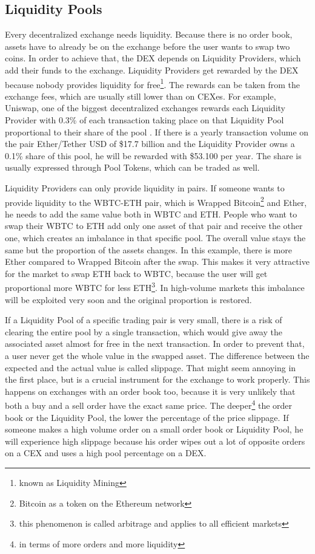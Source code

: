 \subsection{Liquidity Pools}
Every decentralized exchange needs liquidity. Because there is no order book, assets have to already be on the exchange before the user wants to swap two coins. In order to achieve that, the DEX depends on Liquidity Providers, which add their funds to the exchange. Liquidity Providers get rewarded by the DEX because nobody provides liquidity for free\footnote{known as Liquidity Mining}. The rewards can be taken from the exchange fees, which are usually still lower than on CEXes. For example, Uniswap, one of the biggest decentralized exchanges rewards each Liquidity Provider with 0.3\% of each transaction taking place on that Liquidity Pool proportional to their share of the pool \cite{Uniswap2020}. If there is a yearly transaction volume on the pair Ether/Tether USD of \$17.7 billion and the Liquidity Provider owns a 0.1\% share of this pool, he will be rewarded with \$53.100 per year. The share is usually expressed through Pool Tokens, which can be traded as well.

Liquidity Providers can only provide liquidity in pairs. If someone wants to provide liquidity to the WBTC-ETH pair, which is Wrapped Bitcoin\footnote{Bitcoin as a token on the Ethereum network} and Ether, he needs to add the same value both in WBTC and ETH. People who want to swap their WBTC to ETH add only one asset of that pair and receive the other one, which creates an imbalance in that specific pool. The overall value stays the same but the proportion of the assets changes. In this example, there is more Ether compared to Wrapped Bitcoin after the swap. This makes it very attractive for the market to swap ETH back to WBTC, because the user will get proportional more WBTC for less ETH\footnote{this phenomenon is called arbitrage and applies to all efficient markets}. In high-volume markets this imbalance will be exploited very soon and the original proportion is restored.

If a Liquidity Pool of a specific trading pair is very small, there is a risk of clearing the entire pool by a single transaction, which would give away the associated asset almost for free in the next transaction. In order to prevent that, a user never get the whole value in the swapped asset. The difference between the expected and the actual value is called slippage. That might seem annoying in the first place, but is a crucial instrument for the exchange to work properly. This happens on exchanges with an order book too, because it is very unlikely that both a buy and a sell order have the exact same price. The deeper\footnote{in terms of more orders and more liquidity} the order book or the Liquidity Pool, the lower the percentage of the price slippage. If someone makes a high volume order on a small order book or Liquidity Pool, he will experience high slippage because his order wipes out a lot of opposite orders on a CEX and uses a high pool percentage on a DEX.

